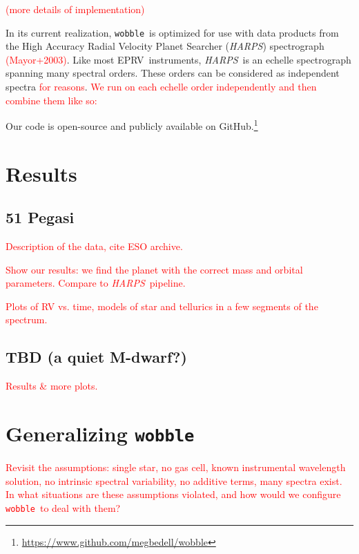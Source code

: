 \documentclass[twocolumn]{aastex62}
\newcommand{\todo}[1]{\textcolor{red}{#1}}  %
\newcommand{\acronym}[1]{{\small{#1}}}
\newcommand{\project}[1]{\textsl{#1}}
\newcommand{\code}[1]{\texttt{#1}}
\newcommand{\HARPS}{\project{\acronym{HARPS}}}
\newcommand{\EPRV}{\acronym{EPRV}}
\newcommand{\wobble}{\code{wobble}}
\begin{document}
\todo{(more details of implementation)}

In its current realization, \wobble\ is optimized for use with data products from the High Accuracy Radial Velocity Planet Searcher (\HARPS) spectrograph \todo{(Mayor+2003)}. Like most \EPRV\ instruments, \HARPS\ is an echelle spectrograph spanning many spectral orders. These orders can be considered as independent spectra \todo{for reasons}. \todo{We run on each echelle order independently and then combine them like so:}


Our code is open-source and publicly available on GitHub.\footnote{\url{https://www.github.com/megbedell/wobble}}



\section{Results}
\label{s:results}
\subsection{51 Pegasi}

\todo{Description of the data, cite \acronym{ESO} archive.}

\todo{Show our results: we find the planet with the correct mass and orbital parameters. Compare to \HARPS\ pipeline.}

\todo{Plots of RV vs. time, models of star and tellurics in a few segments of the spectrum.}

\subsection{TBD (a quiet M-dwarf?)}

\todo{Results \& more plots.}

\section{Generalizing \wobble}
\label{s:future}

\todo{Revisit the assumptions: single star, no gas cell, known instrumental wavelength solution, no intrinsic spectral variability, no additive terms, many spectra exist. 
In what situations are these assumptions violated, and how would we configure \wobble\ to deal with them?}


\end{document}
